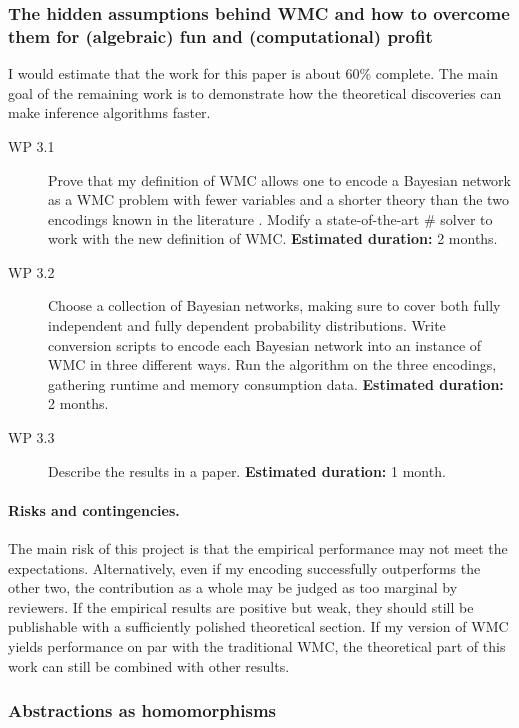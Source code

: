 \documentclass{article}
\begin{document}
\subsubsection{The hidden assumptions behind WMC and how to overcome them for
  (algebraic) fun and (computational) profit}

I would estimate that the work for this paper is about 60\% complete. The main
goal of the remaining work is to demonstrate how the theoretical discoveries can
make inference algorithms faster.
\begin{description}
\item[WP 3.1] Prove that my definition of WMC allows one to encode a Bayesian
  network as a WMC problem with fewer variables and a shorter theory than the
  two encodings known in the literature
  \cite{DBLP:conf/kr/Darwiche02,DBLP:conf/aaai/SangBK05}. Modify a
  state-of-the-art \#\SAT{} solver to work with the new definition of WMC. {\bf
    Estimated duration:} 2 months.
\item[WP 3.2] Choose a collection of Bayesian networks, making sure to cover
  both fully independent and fully dependent probability distributions. Write
  conversion scripts to encode each Bayesian network into an instance of WMC in
  three different ways. Run the algorithm on the three encodings, gathering
  runtime and memory consumption data. {\bf Estimated duration:} 2 months.
\item[WP 3.3] Describe the results in a paper. {\bf Estimated duration:} 1
  month.
\end{description}

\paragraph{Risks and contingencies.} The main risk of this project is that the
empirical performance may not meet the expectations. Alternatively, even if my
encoding successfully outperforms the other two, the contribution as a whole may
be judged as too marginal by reviewers. If the empirical results are positive
but weak, they should still be publishable with a sufficiently polished
theoretical section. If my version of WMC yields performance on par with the
traditional WMC, the theoretical part of this work can still be combined with
other results.

\subsubsection{Abstractions as homomorphisms}
\end{document}
